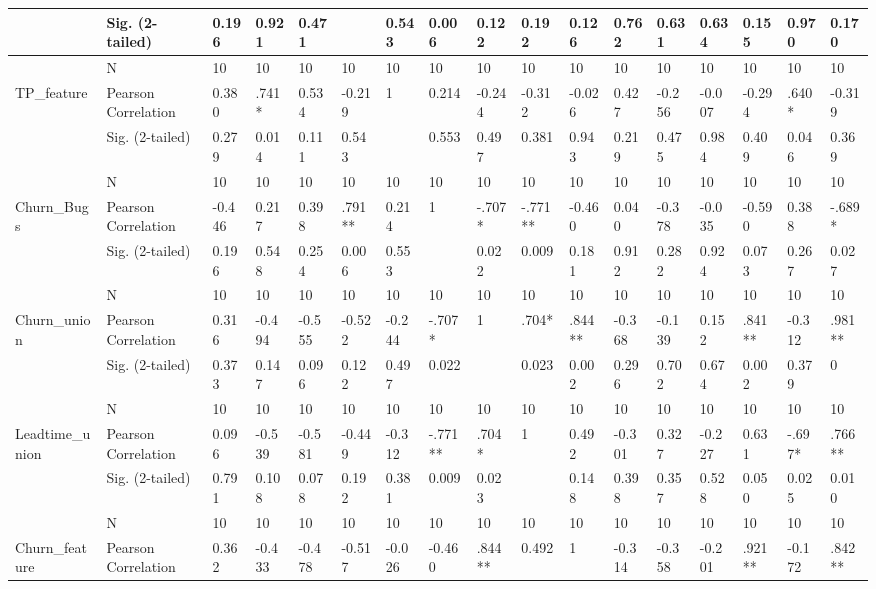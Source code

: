 \documentclass[UKenglish]{ifimaster}  %
\begin{document}
\begin{table}[!htbp]
\begin{adjustwidth}{-2.5cm}{}
{\begin{tabular}{ | l | l | l | l | l | l | l | l | l | l | l | l | l | l | l | l | l | }
	 & Sig. (2-tailed) & 0.196 & 0.921 & 0.471 &  & 0.543 & 0.006 & 0.122 & 0.192 & 0.126 & 0.762 & 0.631 & 0.634 & 0.155 & 0.970 & 0.170\\ \hline
	 & N & 10 & 10 & 10 & 10 & 10 & 10 & 10 & 10 & 10 & 10 & 10 & 10 & 10 & 10 & 10 \\ \hline
	TP\_feature & Pearson Correlation & 0.380 & .741* & 0.534 & -0.219 & 1 & 0.214 & -0.244 & -0.312 & -0.026 & 0.427 & -0.256 & -0.007 & -0.294 & .640* & -0.319\\ \hline
	 & Sig. (2-tailed) & 0.279 & 0.014 & 0.111 & 0.543 &  & 0.553 & 0.497 & 0.381 & 0.943 & 0.219 & 0.475 & 0.984 & 0.409 & 0.046 & 0.369\\ \hline
	 & N & 10 & 10 & 10 & 10 & 10 & 10 & 10 & 10 & 10 & 10 & 10 & 10 & 10 & 10 & 10 \\ \hline
	Churn\_Bugs & Pearson Correlation & -0.446 & 0.217 & 0.398 & .791** & 0.214 & 1 & -.707* & -.771** & -0.460 & 0.040 & -0.378 & -0.035 & -0.590 & 0.388 & -.689* \\ \hline
	 & Sig. (2-tailed) & 0.196 & 0.548 & 0.254 & 0.006 & 0.553 &  & 0.022 & 0.009 & 0.181 & 0.912 & 0.282 & 0.924 & 0.073 & 0.267 & 0.027\\ \hline
	 & N & 10 & 10 & 10 & 10 & 10 & 10 & 10 & 10 & 10 & 10 & 10 & 10 & 10 & 10 & 10 \\ \hline
	Churn\_union & Pearson Correlation & 0.316 & -0.494 & -0.555 & -0.522 & -0.244 & -.707* & 1 & .704* & .844** & -0.368 & -0.139 & 0.152 & .841** & -0.312 & .981** \\ \hline
	 & Sig. (2-tailed) & 0.373 & 0.147 & 0.096 & 0.122 & 0.497 & 0.022 &  & 0.023 & 0.002 & 0.296 & 0.702 & 0.674 & 0.002 & 0.379 & 0\\ \hline
	 & N & 10 & 10 & 10 & 10 & 10 & 10 & 10 & 10 & 10 & 10 & 10 & 10 & 10 & 10 & 10 \\ \hline
	Leadtime\_union & Pearson Correlation & 0.096 & -0.539 & -0.581 & -0.449 & -0.312 & -.771** & .704* & 1 & 0.492 & -0.301 & 0.327 & -0.227 & 0.631 & -.697* & .766** \\ \hline
	 & Sig. (2-tailed) & 0.791 & 0.108 & 0.078 & 0.192 & 0.381 & 0.009 & 0.023 &  & 0.148 & 0.398 & 0.357 & 0.528 & 0.050 & 0.025 & 0.010\\ \hline
	 & N & 10 & 10 & 10 & 10 & 10 & 10 & 10 & 10 & 10 & 10 & 10 & 10 & 10 & 10 & 10 \\ \hline
	Churn\_feature & Pearson Correlation & 0.362 & -0.433 & -0.478 & -0.517 & -0.026 & -0.460 & .844** & 0.492 & 1 & -0.314 & -0.358 & -0.201 & .921** & -0.172 & .842** \\ \hline

\end{tabular}}
\end{adjustwidth}
\end{table}
\end{document}
